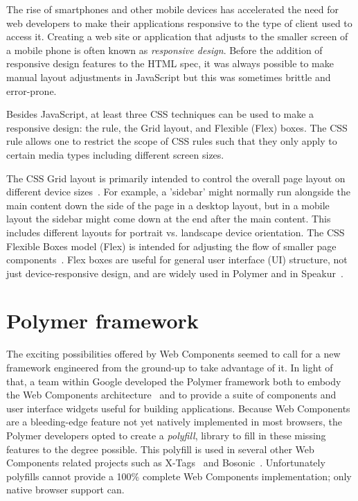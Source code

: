 The rise of smartphones and other mobile devices has accelerated the need for web developers to make their applications responsive to the type of client used to access it.
Creating a web site or application that adjusts to the smaller screen of a mobile phone is often known as \textit{responsive design}.
Before the addition of responsive design features to the HTML spec, 
it was always possible to make manual layout adjustments in JavaScript but this was sometimes brittle and error-prone.

Besides JavaScript, at least three CSS techniques can be used to make a responsive design: 
the  rule, 
the Grid layout, 
and Flexible (Flex) boxes.
The CSS  rule allows one to restrict the scope of CSS rules such that they only apply to certain media types including different screen sizes.

The CSS Grid layout is primarily intended to control the overall page layout on different device sizes~\cite{w3ccontributors2015-d}.
For example, a 'sidebar' might normally run alongside the main content down the side of the page in a desktop layout, but in a mobile layout the sidebar might come down at the end after the main content.
This includes different layouts for portrait vs. landscape device orientation.
The CSS Flexible Boxes model (Flex) is intended for adjusting the flow of smaller page components~\cite{mozillacontributors2015}.
Flex boxes are useful for general user interface (UI) structure, not just device-responsive design, and are widely used in Polymer and in Speakur~\cite{polymercontributors2015-d}.

\section{Polymer framework}

The exciting possibilities offered by Web Components seemed to call for a new framework engineered from the ground-up to take advantage of it.
In light of that, a team within Google developed the 
Polymer framework both to embody the Web Components 
architecture~\cite{polymercontributors2015} and 
to provide a suite of components and user interface widgets useful for building applications.
Because Web Components are a bleeding-edge feature not yet natively implemented in most browsers,
the Polymer developers opted to create a \textit{polyfill}, 
library to fill in these missing features to the degree possible.
This polyfill is used in several other Web Components related projects such as 
X-Tags~\cite{x-tagscontributors2015} and Bosonic~\cite{bosoniccontributors2014}.
Unfortunately polyfills cannot provide a 100\% complete Web Components implementation; 
only native browser support can.

